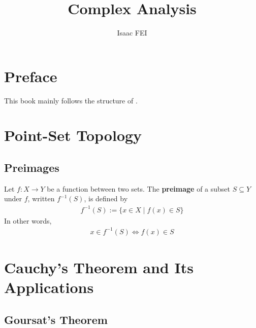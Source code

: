 \documentclass[thmcnt=section, color=cyan, 12pt]{my-elegantbook}
\title{Complex Analysis}
\author{Isaac FEI}
\begin{document}
\maketitle


\frontmatter
\chapter*{Preface}

This book mainly follows the structure of \cite{steinComplexAnalysis2003}.


\tableofcontents
\mainmatter



\chapter{Point-Set Topology}


\section{Preimages}

Let $f: X \to Y$ be a function between two sets. The \textbf{preimage} of a subset $S \subseteq Y$ under $f$,
written $f^{-1}(S)$, is defined by
\begin{align*}
    f^{-1}(S) := \{x \in X \mid f(x) \in S\}
\end{align*}
In other words,
\begin{align*}
    x \in f^{-1}(S) \iff f(x) \in S
\end{align*}


\chapter{Cauchy's Theorem and Its Applications}


\section{Goursat's Theorem}
\end{document}
